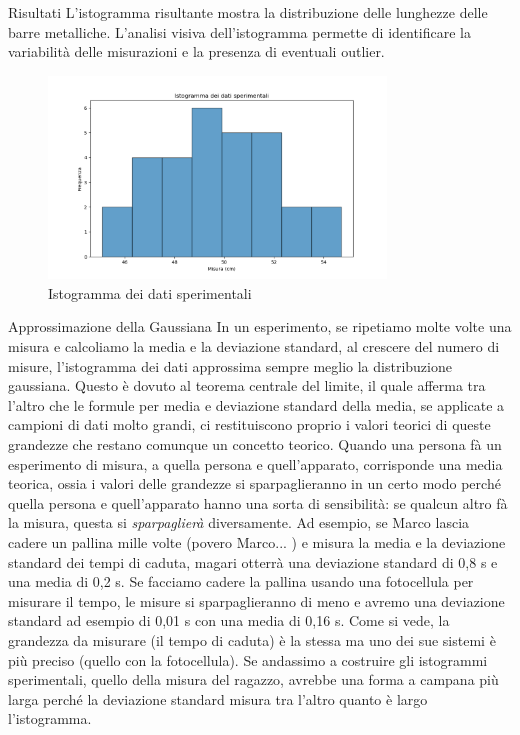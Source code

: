 \documentclass[12pt,a4paper,oneside]{book}
\makeatletter
\renewcommand{\section}{\@startsection{section}{1}{\z@}
{-4ex \@plus -1ex \@minus -.4ex}
{1ex \@plus.2ex }
{\normalfont\large\sffamily\bfseries}}
\renewcommand{\subsection}{\@startsection {subsection}{2}{\z@}
{-3ex \@plus -0.1ex \@minus -.4ex}
{0.5ex \@plus.2ex }
{\color[rgb]{0.141,0.596,0.749}\normalfont\sffamily\bfseries}}
\theoremstyle{esercizio}
\makeatother
\begin{document}
\subsection{Risultati}
L'istogramma risultante mostra la distribuzione delle lunghezze delle barre metalliche. L'analisi visiva dell'istogramma permette di identificare la variabilità delle misurazioni e la presenza di eventuali outlier.

\begin{figure}[!htbp] 
    \centering
    \includegraphics[width=0.8\textwidth]{img/istogramma2.png}
    \caption{Istogramma dei dati sperimentali}
    \label{fig:istogramma2}
\end{figure}



\section{Approssimazione della Gaussiana}
In un esperimento, se ripetiamo molte volte una misura e calcoliamo la media e la deviazione standard, al crescere del numero di misure, l'istogramma dei dati approssima sempre meglio la distribuzione gaussiana. Questo è dovuto al teorema centrale del limite, il quale afferma tra l'altro che le formule per media e deviazione standard della media, se applicate a campioni di dati molto grandi, ci restituiscono proprio i valori teorici di queste grandezze che restano comunque un concetto teorico. Quando una persona fà un esperimento di misura, a quella persona e quell'apparato, corrisponde una media teorica, ossia i valori delle grandezze si sparpaglieranno in un certo modo perché quella persona e quell'apparato hanno una sorta di sensibilità: se qualcun altro fà la misura, questa si \textit{sparpaglierà} diversamente. Ad esempio, se Marco lascia cadere un pallina mille volte (povero Marco... ) e misura la media e la deviazione standard dei tempi di caduta, magari otterrà una deviazione standard di 0,8 s e una media di 0,2 s. Se facciamo cadere la pallina usando una fotocellula per misurare il tempo, le misure si sparpaglieranno di meno e avremo una deviazione standard ad esempio di 0,01 s con una media di 0,16 s. Come si vede, la grandezza da misurare (il tempo di caduta) è la stessa ma uno dei sue sistemi è più preciso (quello con la fotocellula). Se andassimo a costruire gli istogrammi sperimentali, quello della misura del ragazzo, avrebbe una forma a campana più larga perché la deviazione standard misura tra l'altro quanto è largo l'istogramma. 
\end{document}
